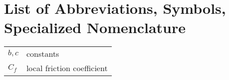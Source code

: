 \chapter{List of Abbreviations, Symbols, Specialized Nomenclature}
{\centering
\begin{tabular}{ll}
$b, c$ & constants\\
$C_f$ & local friction coefficient\\
\end{tabular}
\par}
